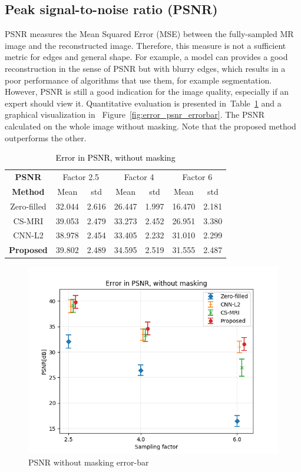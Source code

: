 \documentclass[review]{elsarticle}
\begin{document}
\subsection{Peak signal-to-noise ratio (PSNR)}
PSNR measures the Mean Squared Error (MSE) between the fully-sampled MR image and the reconstructed image. Therefore, this measure is not a sufficient metric for edges and general shape. For example, a model can provides a good reconstruction in the sense of PSNR but with blurry edges, which results in a poor performance of algorithms that use them, for example segmentation.
However, PSNR is still a good indication for the image quality, especially if an expert should view it.
Quantitative evaluation is presented in~Table~\ref{tbl:PSNR_NO_MASK} and a graphical visualization in ~Figure~\ref{fig:error_psnr_errorbar}. The PSNR calculated on the whole image without masking. Note that the proposed method outperforms the other.

\begin{table}[H]
	\centering{}
\begin{tabular}{|c||c|c||c|c||c|c|}
	\hline 
	\textbf{PSNR} & \multicolumn{2}{c||}{Factor 2.5} & \multicolumn{2}{c||}{Factor 4} & \multicolumn{2}{c|}{Factor 6}\tabularnewline \cline{2-7}

	\textbf{Method}     &Mean   &std    &Mean   &std     &Mean   &std \tabularnewline \hline 	
	Zero-filled         &32.044 &2.616  &26.447 &1.997   &16.470 &2.181\tabularnewline
	CS-MRI              &39.053 &2.479  &33.273 &2.452   &26.951 &3.380\tabularnewline
	CNN-L2              &38.978 &2.454  &33.405 &2.232   &31.010 &2.299\tabularnewline
	\textbf{Proposed}   &39.802 &2.489  &34.595 &2.519   &31.555 &2.487\tabularnewline
		\hline 
	\end{tabular}\caption{\textcolor{black}{\footnotesize{}{}Error in PSNR, without masking}{\footnotesize{}\label{tbl:PSNR_NO_MASK}}}
\end{table}

\begin{figure}[H]
\centering
\includegraphics[width=0.7\linewidth]{include/grp2/error_psnr_errorbar}
\caption{PSNR without masking error-bar}
\end{figure}\label{fig:error_psnr_errorbar}
\end{document}
